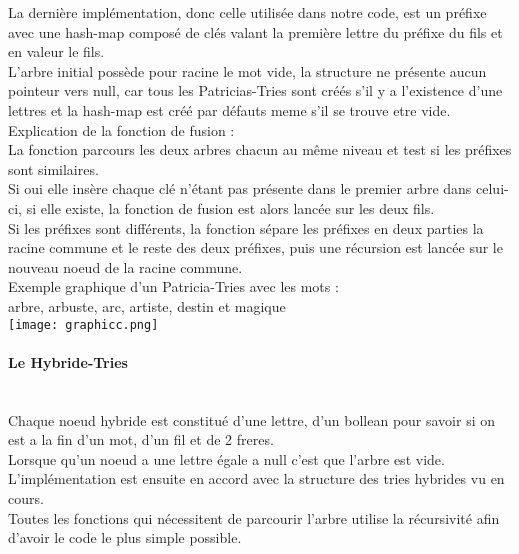 \documentclass{article}
\begin{document}
La derni\`ere impl\'ementation, donc celle utilis\'ee dans notre code, est un pr\'efixe
avec une hash-map compos\'e de cl\'es valant la premi\`ere lettre du pr\'efixe du fils
et en valeur le fils.\\
L'arbre initial poss\`ede pour racine le mot vide, la structure ne pr\'esente aucun pointeur
vers null, car tous les Patricias-Tries sont cr\'e\'es s'il y a l'existence d'une
lettres et la hash-map est cr\'e\'e par d\'efauts meme s'il se trouve etre vide.\\

Explication de la fonction de fusion :\\
La fonction parcours les deux arbres chacun au m\^eme niveau et test si
les pr\'efixes sont similaires.\\
Si oui elle ins\`ere chaque cl\'e n'\'etant pas pr\'esente dans le premier arbre dans
celui-ci, si elle existe, la fonction de fusion est alors lanc\'ee sur les deux
fils.\\
Si les pr\'efixes sont diff\'erents, la fonction s\'epare les pr\'efixes en deux parties
la racine commune et le reste des deux pr\'efixes, puis une r\'ecursion est lanc\'ee
sur le nouveau noeud de la racine commune.\\

Exemple graphique d'un Patricia-Tries avec les mots :\\
arbre, arbuste, arc, artiste, destin et magique\\

\texttt{[image: graphicc.png]}

\newpage

\paragraph{Le Hybride-Tries\\\\}


Chaque noeud hybride est constitu\'e d'une lettre, d'un bollean pour savoir si on 
est a la fin d'un mot, d'un fil et de 2 freres.\\
Lorsque qu'un noeud a une lettre \'egale a null c'est que l'arbre est vide.\\

L'impl\'ementation est ensuite en accord avec la structure des tries hybrides vu 
en cours.\\

Toutes les fonctions qui n\'ecessitent de parcourir l'arbre utilise la r\'ecursivit\'e 
afin d'avoir le code le plus simple possible.\\
\end{document}
